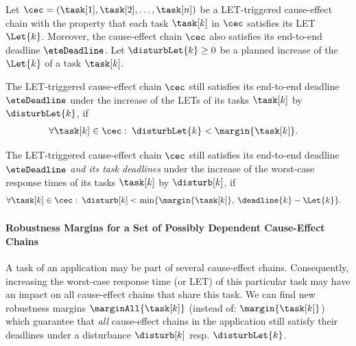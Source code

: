 \begin{tcolorbox}[colback=black!5!white,colframe=black!75!black, breakable, 
title= \textbf{Theorem}: Robustness test for a single LET-triggered cause-effect chain]
Let $\cec = (\task[1], \task[2], \ldots, \task[n])$ be a LET-triggered cause-effect chain with the property that each task $\task[k]$ in $\cec$ satisfies its LET $\Let{k}$. 
Moreover, the cause-effect chain $\cec$ also satisfies its end-to-end deadline $\eteDeadline$.
Let $\disturbLet{k} \geq 0$ be a planned increase of the $\Let{k}$ of a task $\task[k]$.
\smallskip

The LET-triggered cause-effect chain $\cec$ still satisfies its end-to-end deadline $\eteDeadline$ under the increase of the LETs of its tasks $\task[k]$ by $\disturbLet{k}$, if  
\begin{align*}
	& \forall \task[k] \in \cec: \:
	\disturbLet{k} < \margin{\task[k]}. 
\end{align*}	

The LET-triggered cause-effect chain $\cec$ still satisfies its end-to-end deadline $\eteDeadline$ \emph{and its task deadlines} under the increase of the worst-case response times of its tasks $\task[k]$ by $\disturb[k]$, if  
\begin{align*}
	& \forall \task[k] \in \cec: \:
	\disturb[k] < 
	\min \{\margin{\task[k]}, \: \deadline{k} - \Let{k}\}.
\end{align*}	

\end{tcolorbox}
\bigskip

\newpage
\paragraph{Robustness Margins for a Set of Possibly Dependent Cause-Effect Chains}
A task of an application may be part of several cause-effect chains.
Consequently, increasing the worst-case response time (or LET) of this particular task may have an impact on all cause-effect chains that share this task.
We can find new robustness margins $\marginAll{\task[k]}$ (instead of: $\margin{\task[k]}$) which guarantee that \emph{all} cause-effect chains in the application still satisfy their deadlines under a disturbance $\disturb[k]$ resp. $\disturbLet{k}$.
\bigskip

